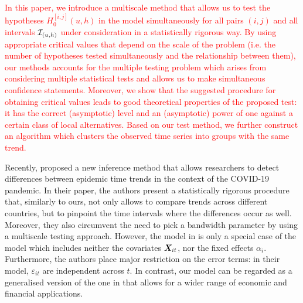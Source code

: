 \documentclass[a4paper,12pt]{article}
\makeatletter
\renewcommand{\eqref}[1]{\tagform@{\ref{#1}}}
\makeatother
\begin{document}
\textcolor{red}{In this paper, we introduce a multiscale method that allows us to test the hypotheses $H_0^{[i, j]}(u, h)$ in the model \eqref{eq:model} simultaneously for all pairs $(i, j)$ and all intervals $\mathcal{I}_{(u, h)}$ under consideration in a statistically rigorous way. By using appropriate critical values that depend on the scale of the problem (i.e. the number of hypotheses tested simultaneously and the relationship between them), our methods accounts for the multiple testing problem which arises from considering multiple statistical tests and allows us to make simultaneous confidence statements. Moreover, we show that the suggested procedure for obtaining critical values leads to good theoretical properties of the proposed test: it has the correct (asymptotic) level and an (asymptotic) power of one against a certain class of local alternatives. Based on our test method, we further construct an algorithm which clusters the observed time series into groups with the same trend.}



Recently, \cite{KhismatullinaVogt2021} proposed a new inference method that allows researchers to detect differences between epidemic time trends in the context of the COVID-19 pandemic. In their paper, the authors present a statistically rigorous procedure that, similarly to ours, not only allows to compare trends across different countries, but to pinpoint the time intervals where the differences occur as well. Moreover, they also circumvent the need to pick a bandwidth parameter by using a multiscale testing approach. However, the model in \cite{KhismatullinaVogt2021} is only a special case of the model \eqref{eq:model} which includes neither the covariates $\boldsymbol{X}_{it}$, nor the fixed effects $\alpha_i$. Furthermore, the authors place major restriction on the error terms: in their model, $\varepsilon_{it}$ are independent across $t$. In contrast, our model \eqref{eq:model} can be regarded as a generalised version of the one in \cite{KhismatullinaVogt2021} that allows for a wider range of economic and financial applications.

\end{document}
